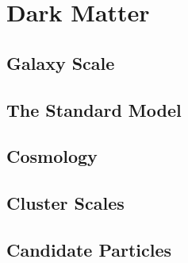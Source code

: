 \cleartooddpage[\thispagestyle{empty}]
\chapter{Dark Matter}

\section{Galaxy Scale}

\section{The Standard Model}

\section{Cosmology}

\section{Cluster Scales}

\section{Candidate Particles}

